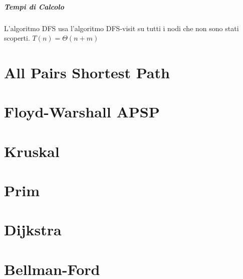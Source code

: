 \paragraph{Tempi di Calcolo}

L'algoritmo DFS usa l'algoritmo DFS-visit su tutti i nodi che non sono stati scoperti.
$T(n) = \Theta(n + m)$

\chapter{All Pairs Shortest Path}

\chapter{Floyd-Warshall APSP}

\chapter{Kruskal}

\chapter{Prim}

\chapter{Dijkstra}

\chapter{Bellman-Ford}
